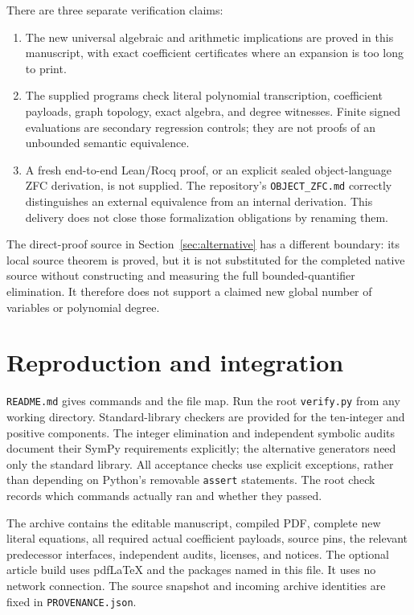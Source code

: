\documentclass[11pt]{article}
\theoremstyle{definition}
\theoremstyle{remark}
\newcommand{\file}[1]{\nolinkurl{#1}}
\begin{document}
There are three separate verification claims:
\begin{enumerate}
\item The new universal algebraic and arithmetic implications are proved
      in this manuscript, with exact coefficient certificates where an
      expansion is too long to print.
\item The supplied programs check literal polynomial transcription,
      coefficient payloads, graph topology, exact algebra, and degree
      witnesses. Finite signed evaluations are secondary regression
      controls; they are not proofs of an unbounded semantic equivalence.
\item A fresh end-to-end Lean/Rocq proof, or an explicit sealed
      object-language ZFC derivation, is not supplied. The repository's
      \file{OBJECT_ZFC.md} correctly distinguishes an external equivalence
      from an internal derivation. This delivery does not close those
      formalization obligations by renaming them.
\end{enumerate}
The direct-proof source in Section~\ref{sec:alternative} has a different
boundary: its local source theorem is proved, but it is not substituted for
the completed native source without constructing and measuring the full
bounded-quantifier elimination. It therefore does not support a claimed
new global number of variables or polynomial degree.

\section{Reproduction and integration}

\file{README.md} gives commands and the file map. Run the root
\file{verify.py} from any working directory. Standard-library checkers are
provided for the ten-integer and positive components. The integer
elimination and independent symbolic audits document their SymPy
requirements explicitly; the alternative generators need only the standard
library. All acceptance checks use explicit exceptions,
rather than depending on Python's removable \file{assert} statements.
The root check records which commands actually ran and whether they passed.

The archive contains the editable manuscript, compiled PDF, complete new
literal equations, all required actual coefficient payloads, source pins,
the relevant predecessor interfaces, independent audits, licenses, and
notices. The optional article build uses pdfLaTeX and the packages named in
this file. It uses no network connection. The source snapshot and incoming
archive identities are fixed in \file{PROVENANCE.json}.
\end{document}
